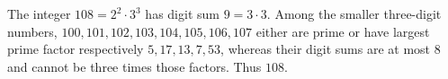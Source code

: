 The integer $108=2^2\cdot3^3$ has digit sum $9=3\cdot3$. Among the smaller three-digit numbers, $100,101,102,103,104,105,106,107$ either are prime or have largest prime factor respectively $5,17,13,7,53$, whereas their digit sums are at most 8 and cannot be three times those factors. Thus $\boxed{108}$.
